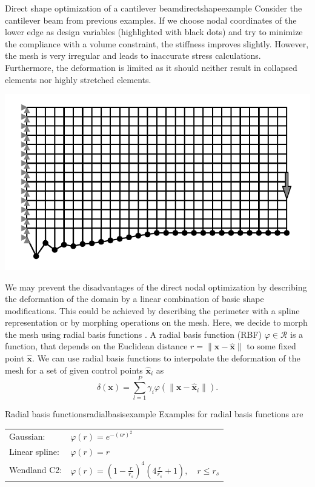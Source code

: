 \begin{example}{Direct shape optimization of a cantilever beam}{directshapeexample}   
    Consider the cantilever beam from previous examples. If we choose nodal coordinates of the lower edge as design variables (highlighted with black dots) and try to minimize the compliance with a volume constraint, the stiffness improves slightly. However, the mesh is very irregular and leads to inaccurate stress calculations. Furthermore, the deformation is limited as it should neither result in collapsed elements nor highly stretched elements. 
    \begin{center}
        \includegraphics[width=0.9\linewidth]{figures/cantilever_fem_naive_shape.pdf}
    \end{center}
\end{example}

We may prevent the disadvantages of the direct nodal optimization by describing the deformation of the domain by a linear combination of basic shape modifications. This could be achieved by describing the perimeter with a spline representation \cite{Christensen2008} or by morphing operations on the mesh. Here, we decide to morph the mesh using radial basis functions \cite{Biancolini20}. 
A radial basis function (RBF) $\varphi \in \mathcal{R}$ is a function, that depends on the Euclidean distance $r = \lVert \mathbf{x}-\hat{\mathbf{x}} \rVert$ to some fixed point $\hat{\mathbf{x}}$.
We can use radial basis functions to interpolate the deformation of the mesh for a set of given control points $\hat{\mathbf{x}}_i$ as 
\begin{equation}
    \delta(\mathbf{x}) = \sum_{l=1}^P \gamma_i \varphi(\lVert \mathbf{x}-\hat{\mathbf{x}}_i \rVert).
\end{equation}

\begin{example}{Radial basis functions}{radialbasisexample}   
    Examples for radial basis functions are
    \begin{center}
        \begin{tabular}{ll}
            Gaussian: & $\varphi(r) = e^{-(\epsilon r)^2}$ \\
            Linear spline: & $\varphi(r) = r$ \\
            Wendland C2: & $\varphi(r) = (1-\frac{r}{r_s})^4(4\frac{r}{r_s}+1),\quad  r \le r_s$ 
        \end{tabular}
    \end{center}
\end{example}

